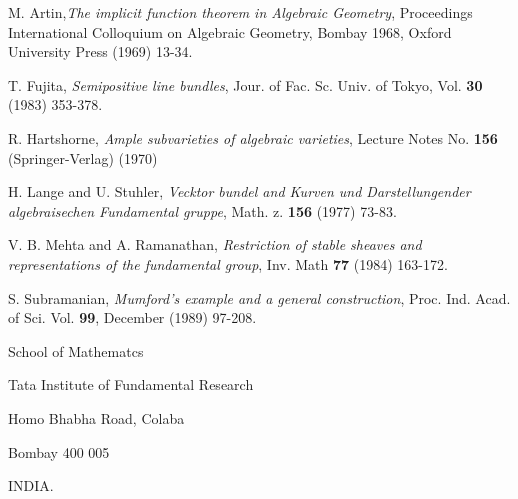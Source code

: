 \begin{thebibliography}{99}
 M. Artin,\textit{The implicit function theorem in  Algebraic Geometry}, Proceedings International Colloquium on Algebraic Geometry, Bombay 1968, Oxford University Press (1969) 13-34.

 T. Fujita, \textit{Semipositive line bundles}, Jour. of Fac. Sc. Univ. of Tokyo, Vol. {\bf 30} (1983) 353-378.

 R. Hartshorne, \textit{Ample subvarieties of algebraic varieties}, Lecture Notes No. {\bf 156} (Springer-Verlag) (1970)

 H. Lange and U. Stuhler, \textit{Vecktor bundel and Kurven und Darstellungender algebraisechen Fundamental gruppe}, Math. z. {\bf 156} (1977) 73-83.

 V. B. Mehta and A. Ramanathan, \textit{Restriction of stable sheaves and representations of the fundamental group}, Inv. Math {\bf 77} (1984) 163-172.

 S. Subramanian, \textit{Mumford's example and a general construction}, Proc. Ind. Acad. of Sci. Vol. {\bf 99}, December (1989) 97-208.
\end{thebibliography}

\begin{flushleft}
School of Mathematcs

Tata Institute of Fundamental Research

Homo Bhabha Road, Colaba

Bombay 400 005

INDIA.
\end{flushleft}
